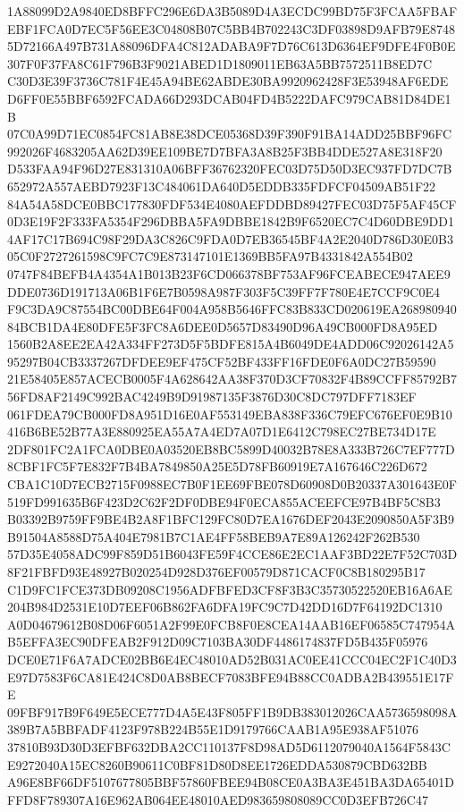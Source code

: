 \documentclass[UTF8,fontset=fandol,zihao=-4,a4paper]{ctexart}
\begin{document}
{{1A88099D2A9840ED8BFFC296E6DA3B5089D4A3ECDC99BD75F3FCAA5FBAFEBF1FCA0D7EC5F56EE3C04808B07C5BB4B702243C3DF03898D9AFB79E8748
5D72166A497B731A88096DFA4C812ADABA9F7D76C613D6364EF9DFE4F0B0E307F0F37FA8C61F796B3F9021ABED1D1809011EB63A5BB7572511B8ED7C
C30D3E39F3736C781F4E45A94BE62ABDE30BA9920962428F3E53948AF6EDED6FF0E55BBF6592FCADA66D293DCAB04FD4B5222DAFC979CAB81D84DE1B
07C0A99D71EC0854FC81AB8E38DCE05368D39F390F91BA14ADD25BBF96FC992026F4683205AA62D39EE109BE7D7BFA3A8B25F3BB4DDE527A8E318F20
D533FAA94F96D27E831310A06BFF36762320FEC03D75D50D3EC937FD7DC7B652972A557AEBD7923F13C484061DA640D5EDDB335FDFCF04509AB51F22
84A54A58DCE0BBC177830FDF534E4080AEFDDBD89427FEC03D75F5AF45CF0D3E19F2F333FA5354F296DBBA5FA9DBBE1842B9F6520EC7C4D60DBE9DD1
4AF17C17B694C98F29DA3C826C9FDA0D7EB36545BF4A2E2040D786D30E0B305C0F2727261598C9FC7C9E873147101E1369BB5FA97B4331842A554B02
0747F84BEFB4A4354A1B013B23F6CD066378BF753AF96FCEABECE947AEE9DDE0736D191713A06B1F6E7B0598A987F303F5C39FF7F780E4E7CCF9C0E4
F9C3DA9C87554BC00DBE64F004A958B5646FFC83B833CD020619EA26898094084BCB1DA4E80DFE5F3FC8A6DEE0D5657D83490D96A49CB000FD8A95ED
1560B2A8EE2EA42A334FF273D5F5BDFE815A4B6049DE4ADD06C92026142A595297B04CB3337267DFDEE9EF475CF52BF433FF16FDE0F6A0DC27B59590
21E58405E857ACECB0005F4A628642AA38F370D3CF70832F4B89CCFF85792B756FD8AF2149C992BAC4249B9D91987135F3876D30C8DC797DFF7183EF
061FDEA79CB000FD8A951D16E0AF553149EBA838F336C79EFC676EF0E9B10416B6BE52B77A3E880925EA55A7A4ED7A07D1E6412C798EC27BE734D17E
2DF801FC2A1FCA0DBE0A03520EB8BC5899D40032B78E8A333B726C7EF777D8CBF1FC5F7E832F7B4BA7849850A25E5D78FB60919E7A167646C226D672
CBA1C10D7ECB2715F0988EC7B0F1EE69FBE078D60908D0B20337A301643E0F519FD991635B6F423D2C62F2DF0DBE94F0ECA855ACEEFCE97B4BF5C8B3
B03392B9759FF9BE4B2A8F1BFC129FC80D7EA1676DEF2043E2090850A5F3B9B91504A8588D75A404E7981B7C1AE4FF58BEB9A7E89A126242F262B530
57D35E4058ADC99F859D51B6043FE59F4CCE86E2EC1AAF3BD22E7F52C703D8F21FBFD93E48927B020254D928D376EF00579D871CACF0C8B180295B17
C1D9FC1FCE373DB09208C1956ADFBFED3CF8F3B3C35730522520EB16A6AE204B984D2531E10D7EEF06B862FA6DFA19FC9C7D42DD16D7F64192DC1310
A0D04679612B08D06F6051A2F99E0FCB8F0E8CEA14AAB16EF06585C747954AB5EFFA3EC90DFEAB2F912D09C7103BA30DF4486174837FD5B435F05976
DCE0E71F6A7ADCE02BB6E4EC48010AD52B031AC0EE41CCC04EC2F1C40D3E97D7583F6CA81E424C8D0AB8BECF7083BFE94B88CC0ADBA2B439551E17FE
09FBF917B9F649E5ECE777D4A5E43F805FF1B9DB383012026CAA5736598098A389B7A5BBFADF4123F978B224B55E1D9179766CAAB1A95E938AF51076
37810B93D30D3EFBF632DBA2CC110137F8D98AD5D6112079040A1564F5843CE9272040A15EC8260B90611C0BF81D80D8EE1726EDDA530879CBD632BB
A96E8BF66DF5107677805BBF57860FBEE94B08CE0A3BA3E451BA3DA65401DFFD8F789307A16E962AB064EE48010AED983659808089CC0D3EFB726C47
}}
\end{document}
